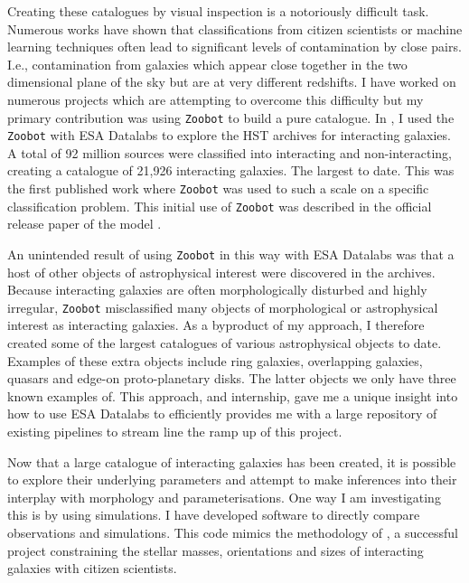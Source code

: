 \documentclass[11pt]{article}
\begin{document}
Creating these catalogues by visual inspection is a notoriously difficult task. Numerous works have shown that classifications from citizen scientists \citep{2010MNRAS.401.1552D} or machine learning \citep{2022A&A...661A..52P} techniques often lead to significant levels of contamination by close pairs. I.e., contamination from galaxies which appear close together in the two dimensional plane of the sky but are at very different redshifts. I have worked on numerous projects which are attempting to overcome this difficulty \citep{bertas..paper, 2022MNRAS.513.1459M} but my primary contribution was using \texttt{Zoobot} to build a pure catalogue. In \citet{2023ApJ...948...40O}, I used the \texttt{Zoobot} with ESA Datalabs to explore the HST archives for interacting galaxies. A total of 92 million sources were classified into interacting and non-interacting, creating a catalogue of 21,926 interacting galaxies. The largest to date. This was the first published work where \texttt{Zoobot} was used to such a scale on a specific classification problem. This initial use of \texttt{Zoobot} was described in the official release paper of the model \citep{2023JOSS....8.5312W}. 

An unintended result of using \texttt{Zoobot} in this way with ESA Datalabs was that a host of other objects of astrophysical interest were discovered in the archives. Because interacting galaxies are often morphologically disturbed and highly irregular, \texttt{Zoobot} misclassified many objects of morphological or astrophysical interest as interacting galaxies. As a byproduct of my approach, I therefore created some of the largest catalogues of various astrophysical objects to date. Examples of these extra objects include ring galaxies, overlapping galaxies, quasars and edge-on proto-planetary disks. The latter objects we only have three known examples of. This approach, and internship, gave me a unique insight into how to use ESA Datalabs to efficiently provides me with a large repository of existing pipelines to stream line the ramp up of this project.

Now that a large catalogue of interacting galaxies has been created, it is possible to explore their underlying parameters and attempt to make inferences into their interplay with morphology and parameterisations. One way I am investigating this is by using simulations. I have developed software to directly compare observations and simulations. This code mimics the methodology of \citet{2016MNRAS.459..720H}, a successful project constraining the stellar masses, orientations and sizes of interacting galaxies with citizen scientists.
\end{document}
